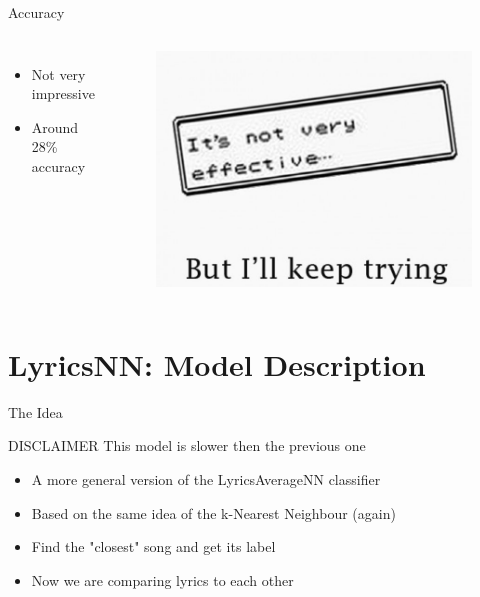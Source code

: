 \documentclass[xcolor=dvipsnames]{beamer}
\begin{document}
\begin{frame}{Accuracy}
\begin{columns}
\begin{itemize}
\item Not very impressive
\item Around 28\% accuracy
\end{itemize}
\begin{figure}
	\includegraphics[scale=0.25,left]{./images/not-effective.jpg}
\end{figure}
\end{columns}
\end{frame}

\section{LyricsNN: Model Description}

\begin{frame}{The Idea}
\begin{block}{DISCLAIMER}
This model is slower then the previous one
\end{block}
\begin{itemize}
\item A more general version of the LyricsAverageNN classifier
\item Based on the same idea of the k-Nearest Neighbour (again)
\item Find the "closest" song and get its label
\item Now we are comparing lyrics to each other
\end{itemize}
\end{frame}
\end{document}
